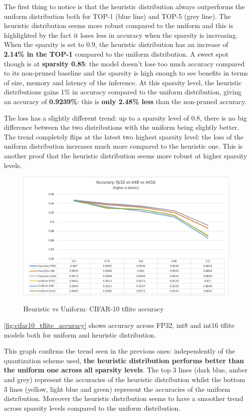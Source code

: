 The first thing to notice is that the heuristic distribution always outperforms
the uniform distribution both for TOP-1 (blue line) and TOP-5 (grey line).
The heuristic distribution seems more robust compared to the uniform and this
is highlighted by the fact it loses less in accuracy when the sparsity is
increasing.
When the sparsity is set to 0.9, the heuristic distribution has an increase of
\textbf{2.14\% in the TOP-1} compared to the uniform distribution.
A sweet spot though is at \textbf{sparsity 0.85}: the model doesn't lose too
much accuracy compared to its non-pruned baseline and the sparsity is high
enough to see benefits in terms of size, memory and latency of the inference.
At this sparsity level, the heuristic distributions gains 1\% in accuracy
compared to the uniform distribution, giving an accuracy of \textbf{0.9239\%}:
this is \textbf{only 2.48\% less} than the non-pruned accuracy.

The loss has a slightly different trend: up to a sparsity level of 0.8, there
is no big difference between the two distributions with the uniform being
slightly better.
The trend completely flips at the latest two highest sparsity level: the loss
of the uniform distribution increases much more compared to the heuristic one.
This is another proof that the heuristic distribution seems more robust at
higher sparsity levels.

\begin{figure}[ht]
    \centering
    {\includegraphics[width=.8\linewidth]{images/experiments/cifar10_tflite_accuracy.png}}
    \caption{Heuristic vs Uniform: CIFAR-10 tflite accuracy}\label{fig:cifar10_tflite_accuracy}
\end{figure}

\autoref{fig:cifar10_tflite_accuracy} shows accuracy across FP32, int8 and
int16 tflite models both for uniform and heuristic distribution.

This graph confirms the trend seen in the previous ones: independently of the
quantization scheme used, \textbf{the heuristic distribution performs better
than the uniform one across all sparsity levels}.
The top 3 lines (dark blue, amber and grey) represent the accuracies of the
heuristic distribution whilst the bottom 3 lines (yellow, light blue and green)
represent the accuracies of the uniform distribution.
Moreover the heuristic distribution seems to have a smoother trend across
sparsity levels compared to the uniform distribution.

